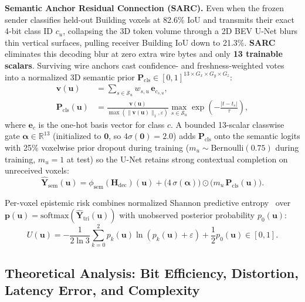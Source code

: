 \documentclass[journal]{IEEEtran}
\begin{document}
\textbf{Semantic Anchor Residual Connection (SARC).} Even when the frozen sender classifies held-out Building voxels at 82.6\% IoU and transmits their exact 4-bit class ID $c_u$, collapsing the 3D token volume through a 2D BEV U-Net blurs thin vertical surfaces, pulling receiver Building IoU down to 21.3\%. \textbf{SARC} eliminates this decoding blur at zero extra wire bytes and only \textbf{13 trainable scalars}. Surviving wire anchors cast confidence- and freshness-weighted votes into a normalized 3D semantic prior $\mathbf{P}_{\mathrm{cls}} \in [0,1]^{13\times G_x\times G_y\times G_z}$:
\begin{equation}
\begin{aligned}
\mathbf{v}(\mathbf{u}) &= \sum_{s \in \mathcal{S}_u} w_{s,u}\,\mathbf{e}_{c_{s,u}}, \\
\mathbf{P}_{\mathrm{cls}}(\mathbf{u}) &= \frac{\mathbf{v}(\mathbf{u})}{\max(\|\mathbf{v}(\mathbf{u})\|_1, \varepsilon)} \max_{s \in \mathcal{S}_u} \exp\!\left(-\frac{|t - t_s|}{\tau}\right),
\end{aligned}
\label{eq:sarc_prior}
\end{equation}
where $\mathbf{e}_{c}$ is the one-hot basis vector for class $c$. A bounded 13-scalar classwise gate $\boldsymbol{\alpha} \in \mathbb{R}^{13}$ (initialized to $\mathbf{0}$, so $4\sigma(\mathbf{0}) = 2.0$) adds $\mathbf{P}_{\mathrm{cls}}$ onto the semantic logits with 25\% voxelwise prior dropout during training ($m_u \sim \mathrm{Bernoulli}(0.75)$ during training, $m_u = 1$ at test) so the U-Net retains strong contextual completion on unreceived voxels:
\begin{equation}
\hat{\mathbf{Y}}_{\mathrm{sem}}(\mathbf{u}) = \phi_{\mathrm{sem}}(\mathbf{H}_{\mathrm{dec}})(\mathbf{u}) + \big(4\,\sigma(\boldsymbol{\alpha})\big) \odot \big(m_u\,\mathbf{P}_{\mathrm{cls}}(\mathbf{u})\big).
\label{eq:sarc_logit}
\end{equation}

Per-voxel epistemic risk combines normalized Shannon predictive entropy~\cite{shannon1948entropy,guo2017calibration} over $\mathbf{p}(\mathbf{u}) = \mathrm{softmax}(\hat{\mathbf{Y}}_{\mathrm{tri}}(\mathbf{u}))$ with unobserved posterior probability $p_0(\mathbf{u})$:
\begin{equation}
U(\mathbf{u}) = -\frac{1}{2\ln 3} \sum_{k=0}^{2} p_k(\mathbf{u}) \ln\!\left(p_k(\mathbf{u}) + \varepsilon\right) + \frac{1}{2} p_0(\mathbf{u}) \in [0, 1].
\label{eq:uncertainty}
\end{equation}

\subsection{Theoretical Analysis: Bit Efficiency, Distortion, Latency Error, and Complexity}
\label{sec:theory}
\end{document}
